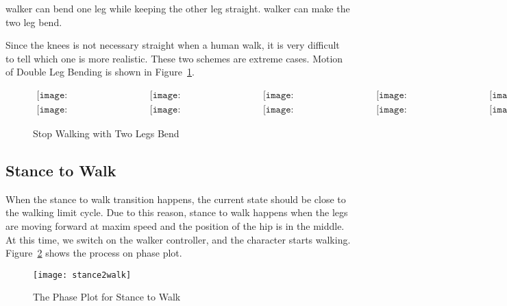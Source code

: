 \begin{itemize}
		walker can bend one leg while keeping the other leg straight.
		walker can make the two leg bend.
\end{itemize}
Since the knees is not necessary straight when a human walk, it is very difficult to tell which one is more realistic. 
These two schemes are extreme cases.
Motion of Double Leg Bending  is shown in Figure~\ref{fig:walkstancestraight}.
\begin{figure}[!htbp]
  \begin{center}
$\begin{array}{ccccc}
\texttt{[image: WalkStanceTransition/0001.eps]}&
\texttt{[image: WalkStanceTransition/0101.eps]}&
\texttt{[image: WalkStanceTransition/0201.eps]}&
\texttt{[image: WalkStanceTransition/0301.eps]}&
\texttt{[image: WalkStanceTransition/0401.eps]}
\\
\texttt{[image: WalkStanceTransition/0501.eps]}&
\texttt{[image: WalkStanceTransition/0601.eps]}&
\texttt{[image: WalkStanceTransition/0701.eps]}&
\texttt{[image: WalkStanceTransition/0801.eps]}&
\texttt{[image: WalkStanceTransition/0901.eps]}
\end{array}$    
    \caption{Stop Walking with Two Legs Bend}
    \label{fig:walkstancestraight}
\end{center}
\end{figure}



\subsection{Stance to Walk}
When the stance to walk transition happens, the current state should  be close to the walking limit cycle.
Due to this reason, stance to walk happens when the legs are moving forward at maxim speed and the position of the hip is in the middle.
At this time, we switch on the walker controller, and the character starts walking.
Figure~\ref{fig:stance2walk} shows the process on phase plot.
\begin{figure}[!htbp]
  \begin{center}
     \texttt{[image: stance2walk]}
    \caption{The Phase Plot for Stance to Walk}
    \label{fig:stance2walk}
\end{center}
\end{figure}


